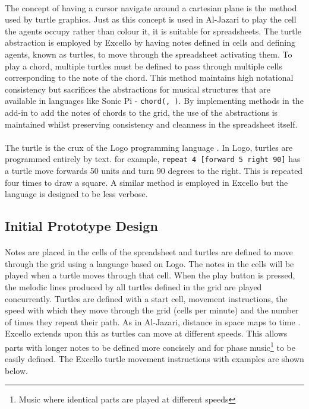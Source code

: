 \paragraph{} The concept of having a cursor navigate around a cartesian plane is the method used by turtle graphics. Just as this concept is used in Al-Jazari to play the cell the agents occupy rather than colour it, it is suitable for spreadsheets. The turtle abstraction is employed by Excello by having notes defined in cells and defining agents, known as turtles, to move through the spreadsheet activating them. To play a chord, multiple turtles must be defined to pass through multiple cells corresponding to the note of the chord. This method maintains high notational consistency but sacrifices the abstractions for musical structures that are available in languages like Sonic Pi - \texttt{chord(, )}. By implementing methods in the add-in to add the notes of chords to the grid, the use of the abstractions is maintained whilst preserving consistency and cleanness in the spreadsheet itself.

\paragraph{} The turtle is the crux of the Logo programming language \cite{goldman:turtle}. In Logo, turtles are programmed entirely by text. for example, \texttt{repeat 4 [forward 5 right 90]} has a turtle move forwards 50 units and turn 90 degrees to the right. This is repeated four times to draw a square. A similar method is employed in Excello but the language is designed to be less verbose.

\subsection{Initial Prototype Design}

\paragraph{} Notes are placed in the cells of the spreadsheet and turtles are defined to move through the grid using a language based on Logo. The notes in the cells will be played when a turtle moves through that cell. When the play button is pressed, the melodic lines produced by all turtles defined in the grid are played concurrently. Turtles are defined with a start cell, movement instructions, the speed with which they move through the grid (cells per minute) and the number of times they repeat their path. As in Al-Jazari, distance in space maps to time \cite{mclean:texture}. Excello extends upon this as turtles can move at different speeds. This allows parts with longer notes to be defined more concisely and for phase music\footnote{Music where identical parts are played at different speeds} to be easily defined. The Excello turtle movement instructions with examples are shown below.

